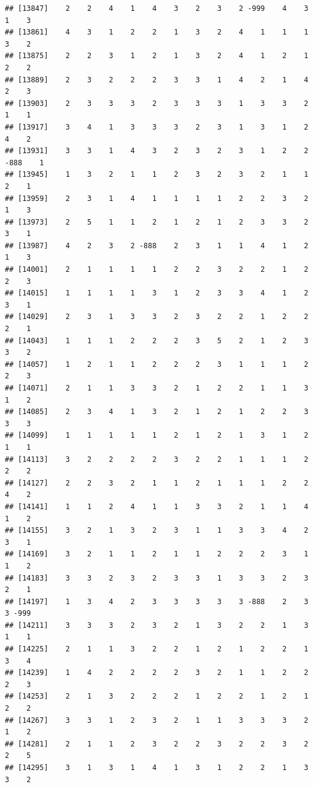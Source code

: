 \documentclass[
  12pt,
  openany]{book}
\begin{document}
\begin{verbatim}
## [13847]    2    2    4    1    4    3    2    3    2 -999    4    3    1    3
## [13861]    4    3    1    2    2    1    3    2    4    1    1    1    3    2
## [13875]    2    2    3    1    2    1    3    2    4    1    2    1    2    2
## [13889]    2    3    2    2    2    3    3    1    4    2    1    4    2    3
## [13903]    2    3    3    3    2    3    3    3    1    3    3    2    1    1
## [13917]    3    4    1    3    3    3    2    3    1    3    1    2    4    2
## [13931]    3    3    1    4    3    2    3    2    3    1    2    2 -888    1
## [13945]    1    3    2    1    1    2    3    2    3    2    1    1    2    1
## [13959]    2    3    1    4    1    1    1    1    2    2    3    2    1    3
## [13973]    2    5    1    1    2    1    2    1    2    3    3    2    3    1
## [13987]    4    2    3    2 -888    2    3    1    1    4    1    2    1    3
## [14001]    2    1    1    1    1    2    2    3    2    2    1    2    2    3
## [14015]    1    1    1    1    3    1    2    3    3    4    1    2    3    1
## [14029]    2    3    1    3    3    2    3    2    2    1    2    2    2    1
## [14043]    1    1    1    2    2    2    3    5    2    1    2    3    3    2
## [14057]    1    2    1    1    2    2    2    3    1    1    1    2    2    3
## [14071]    2    1    1    3    3    2    1    2    2    1    1    3    1    2
## [14085]    2    3    4    1    3    2    1    2    1    2    2    3    3    3
## [14099]    1    1    1    1    1    2    1    2    1    3    1    2    1    1
## [14113]    3    2    2    2    2    3    2    2    1    1    1    2    2    2
## [14127]    2    2    3    2    1    1    2    1    1    1    2    2    4    2
## [14141]    1    1    2    4    1    1    3    3    2    1    1    4    1    2
## [14155]    3    2    1    3    2    3    1    1    3    3    4    2    3    1
## [14169]    3    2    1    1    2    1    1    2    2    2    3    1    1    2
## [14183]    3    3    2    3    2    3    3    1    3    3    2    3    2    1
## [14197]    1    3    4    2    3    3    3    3    3 -888    2    3    3 -999
## [14211]    3    3    3    2    3    2    1    3    2    2    1    3    1    1
## [14225]    2    1    1    3    2    2    1    2    1    2    2    1    3    4
## [14239]    1    4    2    2    2    2    3    2    1    1    2    2    2    3
## [14253]    2    1    3    2    2    2    1    2    2    1    2    1    2    2
## [14267]    3    3    1    2    3    2    1    1    3    3    3    2    1    2
## [14281]    2    1    1    2    3    2    2    3    2    2    3    2    2    5
## [14295]    3    1    3    1    4    1    3    1    2    2    1    3    3    2

\end{verbatim}
\end{document}
